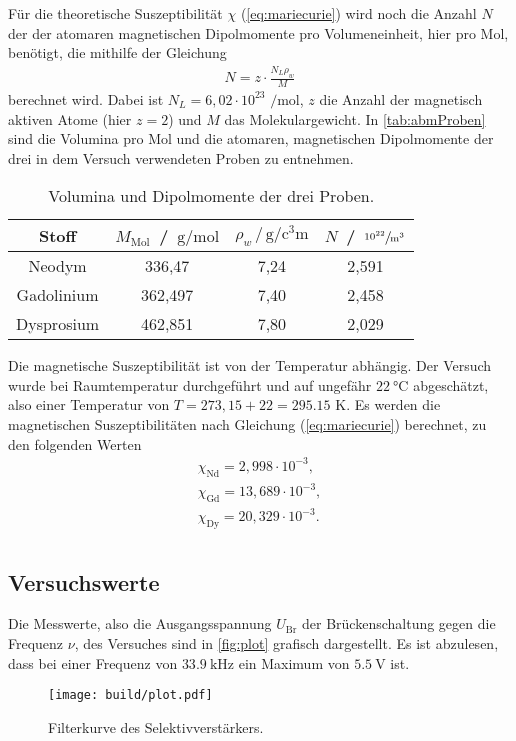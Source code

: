 \noindent
Für die theoretische Suszeptibilität $\chi$ (\ref{eq:mariecurie}) wird noch die Anzahl $N$ der der atomaren magnetischen Dipolmomente pro Volumeneinheit, hier pro Mol, benötigt, die mithilfe der Gleichung 
\begin{align*}
  N = z\cdot \frac{N_L \rho_w}{M}
\end{align*}
berechnet wird. Dabei ist $N_L = 6,02 \cdot 10^{23}$ $\si{\per\mole}$, $z$ die Anzahl der magnetisch aktiven Atome (hier $z=2$) und $M$ das Molekulargewicht.
In \autoref{tab:abmProben} sind die Volumina pro Mol und die atomaren, magnetischen Dipolmomente der drei in dem Versuch verwendeten Proben zu entnehmen.
\begin{table}[H]
  \centering
  \caption{Volumina und Dipolmomente der drei Proben.}
  \label{tab:abmProben}
  \begin{tabular}{c|c c c}
    \toprule
    Stoff & $M_{\text{Mol}}$ \,/\, $\si{\gram\per\mole}$ & $\rho_w \, / \, \si{\gram\per\cubic\centi\meter}$ & $N$ \,/\, $\sfrac{10^{22}}{\si{\cubic\meter}}$ \\
    \midrule
    Neodym & 336,47 & 7,24 & 2,591 \\
    Gadolinium & 362,497 & 7,40 & 2,458 \\
    Dysprosium & 462,851 & 7,80 & 2,029 \\
    \bottomrule
  \end{tabular}
\end{table}

\noindent
Die magnetische Suszeptibilität ist von der Temperatur abhängig. Der Versuch wurde bei Raumtemperatur durchgeführt und auf ungefähr $\SI{22}{\degreeCelsius}$ abgeschätzt, also einer Temperatur von $T = 273,15 + 22 = 295.15$ K.
Es werden die magnetischen Suszeptibilitäten nach Gleichung (\ref{eq:mariecurie}) berechnet, zu den folgenden Werten
\begin{align*}
  \chi_{\text{Nd}} = 2,998 \cdot 10^{-3},  \\
  \chi_{\text{Gd}} = 13,689 \cdot 10^{-3}, \\
  \chi_{\text{Dy}} = 20,329 \cdot 10^{-3}. \\
\end{align*}






\subsection{Versuchswerte}
\label{subsec:versuchsW}
Die Messwerte, also die Ausgangsspannung $U_{\text{Br}}$ der Brückenschaltung gegen die Frequenz $\nu$, des Versuches sind in \autoref{fig:plot} grafisch dargestellt.
Es ist abzulesen, dass bei einer Frequenz von $\SI{33,9}{\kilo\hertz}$ ein Maximum von $\SI{5,5}{\volt}$ ist. 
\begin{figure}[H]
  \centering
  \texttt{[image: build/plot.pdf]}
  \caption{Filterkurve des Selektivverstärkers.}
  \label{fig:plot}
\end{figure}

